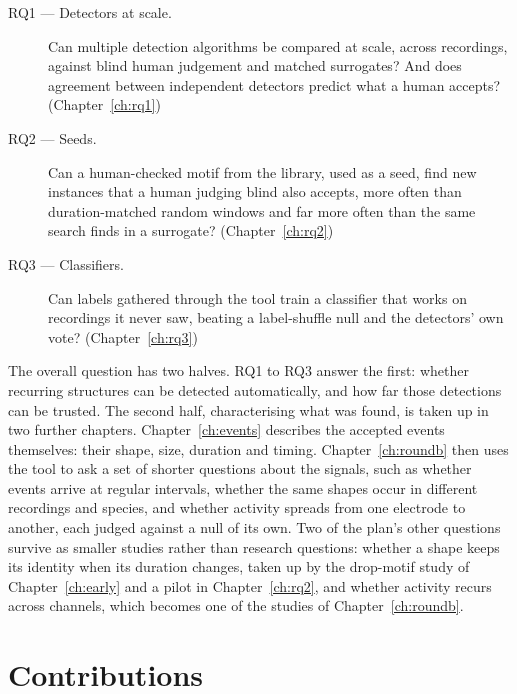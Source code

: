 \begin{description}
  \item[RQ1 --- Detectors at scale.] Can multiple detection algorithms be compared at scale, across recordings, against blind human judgement and matched surrogates? And does agreement between independent detectors predict what a human accepts? (Chapter~\ref{ch:rq1})
  \item[RQ2 --- Seeds.] Can a human-checked motif from the library, used as a seed, find new instances that a human judging blind also accepts, more often than duration-matched random windows and far more often than the same search finds in a surrogate? (Chapter~\ref{ch:rq2})
  \item[RQ3 --- Classifiers.] Can labels gathered through the tool train a classifier that works on recordings it never saw, beating a label-shuffle null and the detectors' own vote? (Chapter~\ref{ch:rq3})
\end{description}

The overall question has two halves. RQ1 to RQ3 answer the first: whether recurring structures can be detected automatically, and how far those detections can be trusted. The second half, characterising what was found, is taken up in two further chapters. Chapter~\ref{ch:events} describes the accepted events themselves: their shape, size, duration and timing. Chapter~\ref{ch:roundb} then uses the tool to ask a set of shorter questions about the signals, such as whether events arrive at regular intervals, whether the same shapes occur in different recordings and species, and whether activity spreads from one electrode to another, each judged against a null of its own. Two of the plan's other questions survive as smaller studies rather than research questions: whether a shape keeps its identity when its duration changes, taken up by the drop-motif study of Chapter~\ref{ch:early} and a pilot in Chapter~\ref{ch:rq2}, and whether activity recurs across channels, which becomes one of the studies of Chapter~\ref{ch:roundb}.

\section{Contributions}
\label{sec:contributions}

